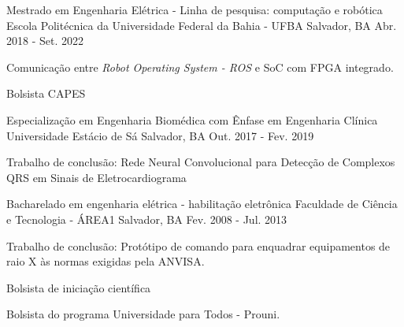 

\begin{cventries}
  

  \cventry
    {Mestrado em Engenharia Elétrica - Linha de pesquisa: computação e robótica} %
    {Escola Politécnica da Universidade Federal da Bahia - UFBA} %
    {Salvador, BA} %
    {Abr. 2018 - Set. 2022} %
    {
      \begin{cvitems} %
        \item {Comunicação entre \textit{Robot Operating System - ROS} e SoC com FPGA integrado.}
        \item {Bolsista CAPES}
      \end{cvitems}
    }


  \cventry
    {Especialização em Engenharia Biomédica com Ênfase em Engenharia Clínica} %
    {Universidade Estácio de Sá} %
    {Salvador, BA} %
    {Out. 2017 - Fev. 2019} %
    {
      \begin{cvitems} %
        \item {Trabalho de conclusão: Rede Neural Convolucional para Detecção de Complexos QRS em Sinais de Eletrocardiograma}
      \end{cvitems}
    }


  \cventry
    {Bacharelado em engenharia elétrica - habilitação eletrônica} %
    {Faculdade de Ciência e Tecnologia - ÁREA1} %
    {Salvador, BA} %
    {Fev. 2008 - Jul. 2013} %
    {
      \begin{cvitems} %
        \item {Trabalho de conclusão: Protótipo de comando para enquadrar equipamentos de raio X às normas exigidas pela ANVISA.}
        \item {Bolsista de iniciação científica}
        \item {Bolsista do programa Universidade para Todos - Prouni.}
      \end{cvitems}
    }


\end{cventries}
